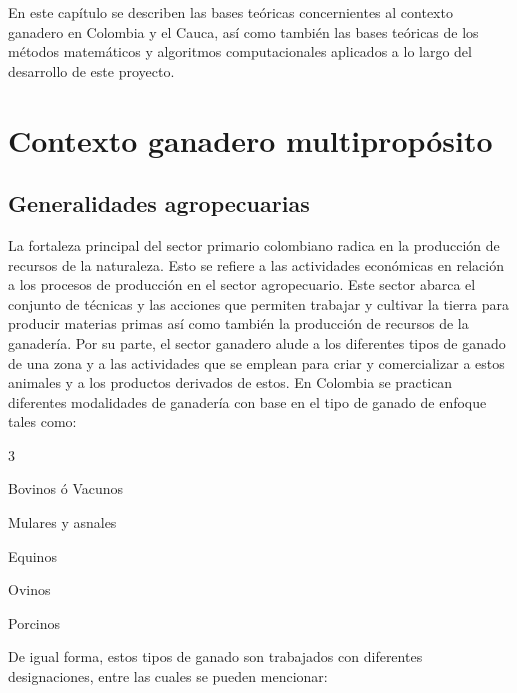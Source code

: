 
En este capítulo se describen las bases teóricas  concernientes al contexto ganadero en Colombia y el Cauca, así como también las bases teóricas de los métodos matemáticos y algoritmos computacionales aplicados a lo largo del desarrollo de este proyecto.

\section{Contexto ganadero multipropósito} \label{contexgan}
\subsection{Generalidades agropecuarias} \label{tgan}

La fortaleza principal del sector primario colombiano radica en la producción de recursos de la naturaleza. Esto se refiere a las actividades económicas en relación a los procesos de producción en el sector agropecuario. Este sector abarca el conjunto de técnicas y las acciones que permiten trabajar y cultivar la tierra para producir materias primas así como también la producción de recursos de la ganadería. Por su parte, el sector ganadero alude a los diferentes tipos de ganado de una zona y a las actividades que se emplean para criar y comercializar a estos animales y a los productos derivados de estos. En Colombia se practican diferentes modalidades de ganadería con base en el tipo de ganado de enfoque tales como:

\begin{itemize}
\begin{multicols}{3}
    \item Bovinos ó Vacunos
    \item Mulares y asnales
    \item Equinos
    \item Ovinos
    \item Porcinos
\end{multicols}
\end{itemize}

De igual forma, estos tipos de ganado son trabajados con diferentes designaciones, entre las cuales se pueden mencionar:


